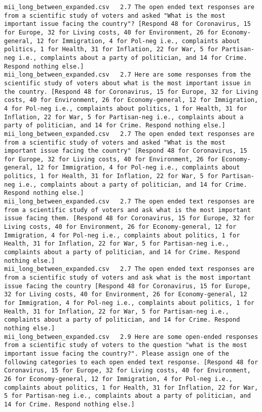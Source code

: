 \begin{lstlisting}[label=lst:promptvariants]
mii_long_between_expanded.csv	2.7	The open ended text responses are from a scientific study of voters and asked "What is the most important issue facing the country"? [Respond 48 for Coronavirus, 15 for Europe, 32 for Living costs, 40 for Environment, 26 for Economy-general, 12 for Immigration, 4 for Pol-neg i.e., complaints about politics, 1 for Health, 31 for Inflation, 22 for War, 5 for Partisan-neg i.e., complaints about a party of politician, and 14 for Crime. Respond nothing else.]
mii_long_between_expanded.csv	2.7	Here are some responses from the scientific study of voters about what is the most important issue in the country. [Respond 48 for Coronavirus, 15 for Europe, 32 for Living costs, 40 for Environment, 26 for Economy-general, 12 for Immigration, 4 for Pol-neg i.e., complaints about politics, 1 for Health, 31 for Inflation, 22 for War, 5 for Partisan-neg i.e., complaints about a party of politician, and 14 for Crime. Respond nothing else.]
mii_long_between_expanded.csv	2.7	The open ended text responses are from a scientific study of voters and asked "What is the most important issue facing the country" [Respond 48 for Coronavirus, 15 for Europe, 32 for Living costs, 40 for Environment, 26 for Economy-general, 12 for Immigration, 4 for Pol-neg i.e., complaints about politics, 1 for Health, 31 for Inflation, 22 for War, 5 for Partisan-neg i.e., complaints about a party of politician, and 14 for Crime. Respond nothing else.]
mii_long_between_expanded.csv	2.7	The open ended text responses are from a scientific study of voters and ask what is the most important issue facing them. [Respond 48 for Coronavirus, 15 for Europe, 32 for Living costs, 40 for Environment, 26 for Economy-general, 12 for Immigration, 4 for Pol-neg i.e., complaints about politics, 1 for Health, 31 for Inflation, 22 for War, 5 for Partisan-neg i.e., complaints about a party of politician, and 14 for Crime. Respond nothing else.]
mii_long_between_expanded.csv	2.7	The open ended text responses are from a scientific study of voters and ask what is the most important issue facing the country [Respond 48 for Coronavirus, 15 for Europe, 32 for Living costs, 40 for Environment, 26 for Economy-general, 12 for Immigration, 4 for Pol-neg i.e., complaints about politics, 1 for Health, 31 for Inflation, 22 for War, 5 for Partisan-neg i.e., complaints about a party of politician, and 14 for Crime. Respond nothing else.]
mii_long_between_expanded.csv	2.9	Here are some open-ended responses from a scientific study of voters to the question "what is the most important issue facing the country?". Please assign one of the following categories to each open ended text response. [Respond 48 for Coronavirus, 15 for Europe, 32 for Living costs, 40 for Environment, 26 for Economy-general, 12 for Immigration, 4 for Pol-neg i.e., complaints about politics, 1 for Health, 31 for Inflation, 22 for War, 5 for Partisan-neg i.e., complaints about a party of politician, and 14 for Crime. Respond nothing else.]

\end{lstlisting}
